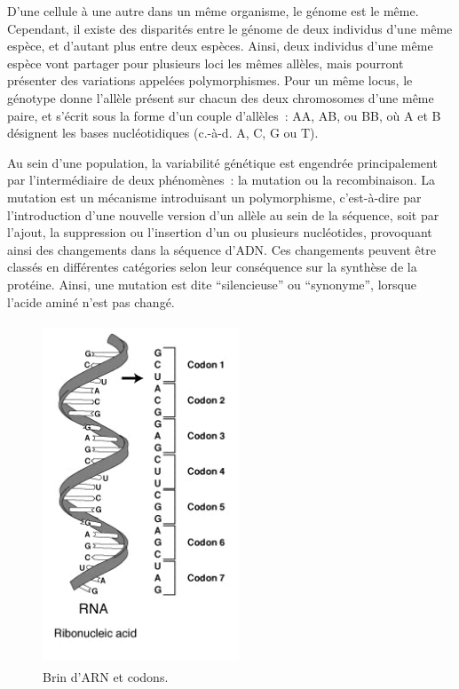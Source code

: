 \documentclass[11pt,a4paper,notrimn]{krantz}
\theoremstyle{definition}
\theoremstyle{definition}
\theoremstyle{remark}
\begin{document}
D'une cellule à une autre dans un même organisme, le génome est le même.
Cependant, il existe des disparités entre le génome de deux individus
d'une même espèce, et d'autant plus entre deux espèces. Ainsi, deux
individus d'une même espèce vont partager pour plusieurs loci les mêmes
allèles, mais pourront présenter des variations appelées polymorphismes.
Pour un même locus, le génotype donne l'allèle présent sur chacun des
deux chromosomes d'une même paire, et s'écrit sous la forme d'un couple
d'allèles~: AA, AB, ou BB, où A et B désignent les bases nucléotidiques
(c.-à-d. A, C, G ou T).

Au sein d'une population, la variabilité génétique est engendrée
principalement par l'intermédiaire de deux phénomènes~: la mutation ou
la recombinaison. La mutation est un mécanisme introduisant un
polymorphisme, c'est-à-dire par l'introduction d'une nouvelle version
d'un allèle au sein de la séquence, soit par l'ajout, la suppression ou
l'insertion d'un ou plusieurs nucléotides, provoquant ainsi des
changements dans la séquence d'ADN. Ces changements peuvent être classés
en différentes catégories selon leur conséquence sur la synthèse de la
protéine. Ainsi, une mutation est dite ``silencieuse'' ou ``synonyme'',
lorsque l'acide aminé n'est pas changé.



\begin{figure}[!htb]

{\centering \includegraphics[width=2.3in,height=4in]{FiguresTables/RNA-codon} 

}

\caption{Brin d'ARN et codons.}\label{fig:RNAcodon}
\end{figure}
\end{document}
